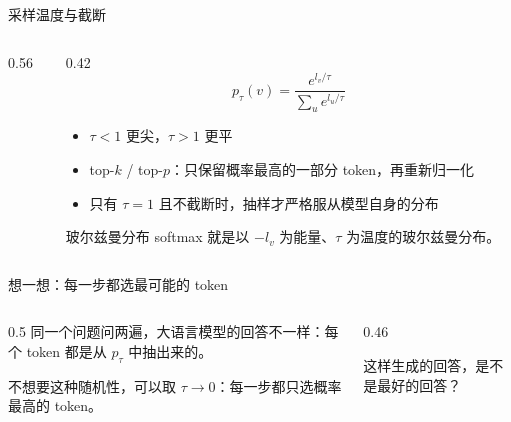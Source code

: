 \documentclass[aspectratio=169,10pt,UTF8,fontset=none]{ctexbeamer}
\begin{document}
\begin{frame}{采样温度与截断}
  \begin{columns}[c]
    \begin{column}{0.56\textwidth}
      \centering
      \par\vspace{1mm}
      {\scriptsize{}}
    \end{column}
    \begin{column}{0.42\textwidth}
      \[
        p_\tau(v)=\frac{e^{l_v/\tau}}{\sum_u e^{l_u/\tau}}
      \]
      \begin{itemize}
        \item $\tau<1$ 更尖，$\tau>1$ 更平
        \item top-$k$ / top-$p$：只保留概率最高的一部分 token，再重新归一化
        \item 只有 $\tau=1$ 且不截断时，抽样才严格服从模型自身的分布
      \end{itemize}
      \begin{concept}{玻尔兹曼分布}
        softmax 就是以 $-l_v$ 为能量、$\tau$ 为温度的玻尔兹曼分布。
      \end{concept}
    \end{column}
  \end{columns}
\end{frame}

\begin{frame}{想一想：每一步都选最可能的 token}
  \begin{columns}[c]
    \begin{column}{0.5\textwidth}
      同一个问题问两遍，大语言模型的回答不一样：每个 token 都是从 $p_\tau$ 中抽出来的。
      \vspace{3mm}

      不想要这种随机性，可以取 $\tau\to0$：每一步都只选概率最高的 token。
    \end{column}
    \begin{column}{0.46\textwidth}
      \begin{hook}
        这样生成的回答，是不是最好的回答？
        \par\medskip
      \end{hook}
    \end{column}
  \end{columns}
\end{frame}
\end{document}
